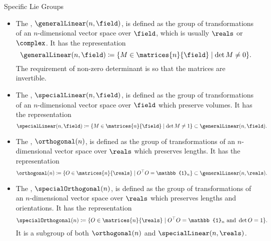 \documentclass[fleqn]{NotesClass}
\newcommand{\subgroup}{\subset}
\newcommand*{\trans}{\top}
\newcommand*{\ident}{\mathbb{1}}
\begin{document}
    \begin{dfn}{Specific Lie Groups}{}
        \begin{itemize}
            \item The , \(\generalLinear(n, \field)\), is defined as the group of transformations of an \(n\)-dimensional vector space over \(\field\), which is usually \(\reals\) or \(\complex\).
            It has the representation
            \begin{equation}
                \generalLinear(n, \field) \coloneqq \{M \in \matrices{n}{\field} \mid \det M \ne 0\}.
            \end{equation}
            The requirement of non-zero determinant is so that the matrices are invertible.
            
            \item The , \(\specialLinear(n, \field)\), is defined as the group of transformations of an \(n\)-dimensional vector space over \(\field\) which preserve volumes.
            It has the representation
            \begin{equation}
                \specialLinear(n, \field) \coloneqq \{M \in \matrices{n}{\field} \mid \det M \ne 1\} \subgroup \generalLinear(n, \field).
            \end{equation}
            
            \item The , \(\orthogonal(n)\), is defined as the group of transformations of an \(n\)-dimensional vector space over \(\reals\) which preserves lengths.
            It has the representation
            \begin{equation}
                \orthogonal(n) \coloneqq \{O \in \matrices{n}{\reals} \mid O^\trans O = \ident_n\} \subgroup \generalLinear(n, \reals).
            \end{equation}
            
            \item The , \(\specialOrthogonal(n)\), is defined as the group of transformations of an \(n\)-dimensional vector space over \(\reals\) which preserves lengths and orientations.
            It has the representation
            \begin{equation}
                \specialOrthogonal(n) \coloneqq \{O \in \matrices{n}{\reals} \mid O^\trans O = \ident_n \text{ and } \det O = 1\}.
            \end{equation}
            It is a subgroup of both \(\orthogonal(n)\) and \(\specialLinear(n, \reals)\).
            

\end{itemize}
\end{dfn}
\end{document}
